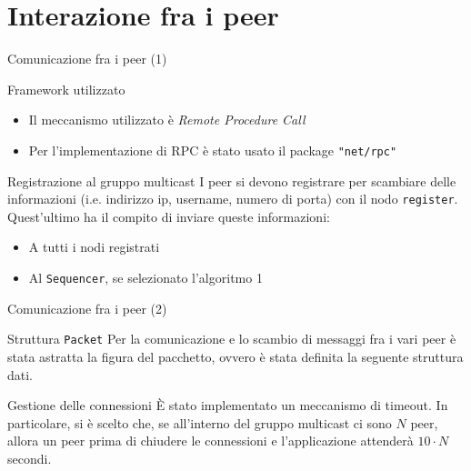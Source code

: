 \documentclass[
	usepdftitle=false,
	xcolor={table, dvipsnames},
	hyperref={
		pdftitle={Multicast totalmente e causalmente ordinato in Go},
    	pdfauthor={A. Chillotti}
    }
]{beamer}
\begin{document}
\section{Interazione fra i peer}

\begin{frame}{Comunicazione fra i peer (1)}

\begin{block}{Framework utilizzato}
\begin{itemize}
\item Il meccanismo utilizzato è \textit{Remote Procedure Call}
\item Per l'implementazione di RPC è stato usato il package \texttt{"net/rpc"}
\end{itemize}
\end{block}

\begin{block}{Registrazione al gruppo multicast}
I peer si devono registrare per scambiare delle informazioni (i.e. indirizzo ip, username, numero di porta) con il nodo \texttt{register}. Quest'ultimo ha il compito di inviare queste informazioni:
\begin{itemize}
\item A tutti i nodi registrati
\item Al \texttt{Sequencer}, se selezionato l'algoritmo 1
\end{itemize}
\end{block}
\end{frame}

\begin{frame}{Comunicazione fra i peer (2)}

\begin{block}{Struttura \texttt{Packet}}
Per la comunicazione e lo scambio di messaggi fra i vari peer è stata astratta la figura del pacchetto, ovvero è stata definita la seguente struttura dati.
\begin{figure}[ht]
\centering
{}
\end{figure}
\end{block}

\begin{block}{Gestione delle connessioni}
È stato implementato un meccanismo di timeout. In particolare, si è scelto che, se all'interno del gruppo multicast ci sono $N$ peer, allora un peer prima di chiudere le connessioni e l'applicazione attenderà $10 \cdot N$ secondi.
\end{block}

\end{frame}
\end{document}
